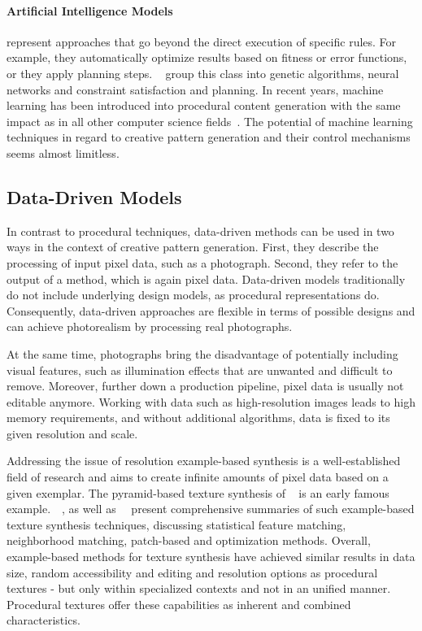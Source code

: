 \paragraph*{Artificial Intelligence Models} represent approaches that go beyond the direct execution of specific rules. For example, they automatically optimize results based on fitness or error functions, or they apply planning steps. \citeauthor*{hendrikx_2013_pcg}~\cite{hendrikx_2013_pcg} group this class into genetic algorithms, neural networks and constraint satisfaction and planning. In recent years, machine learning has been introduced into procedural content generation with the same impact as in all other computer science fields~\cite{summerville_2017_pcg}. The potential of machine learning techniques in regard to creative pattern generation and their control mechanisms seems almost limitless.



\subsection[Data-Driven]{Data-Driven Models}
\label{subsec:design_models_datadriven}

In contrast to procedural techniques, data-driven methods can be used in two ways in the context of creative pattern generation. First, they describe the processing of input pixel data, such as a photograph. Second, they refer to the output of a method, which is again pixel data. Data-driven models traditionally do not include underlying design models, as procedural representations do. Consequently, data-driven approaches are flexible in terms of possible designs and can achieve photorealism by processing real photographs.

At the same time, photographs bring the disadvantage of potentially including visual features, such as illumination effects that are unwanted and difficult to remove. Moreover, further down a production pipeline, pixel data is usually not editable anymore. Working with data such as high-resolution images leads to high memory requirements, and without additional algorithms, data is fixed to its given resolution and scale.

Addressing the issue of resolution example-based synthesis is a well-established field of research and aims to create infinite amounts of pixel data based on a given exemplar. The pyramid-based texture synthesis of \citeauthor*{heeger_1995_pbt}~\cite{heeger_1995_pbt} is an early famous example.~\citeauthor*{wei_2009_seb}~\cite{wei_2009_seb}, as well as~\citeauthor*{barnes_2017_aso}~\cite{barnes_2017_aso} present comprehensive summaries of such example-based texture synthesis techniques, discussing statistical feature matching, neighborhood matching, patch-based and optimization methods. Overall, example-based methods for texture synthesis have achieved similar results in data size, random accessibility and editing and resolution options as procedural textures - but only within specialized contexts and not in an unified manner. Procedural textures offer these capabilities as inherent and combined characteristics.

